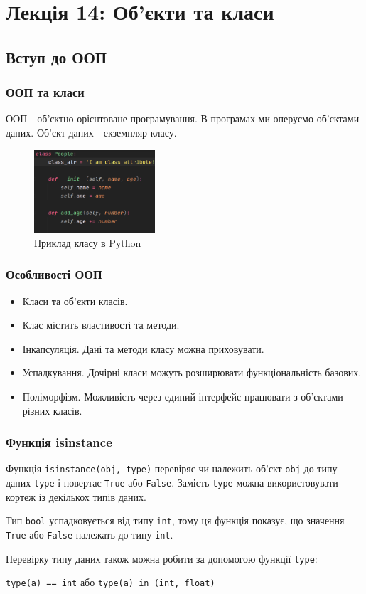 \section*{Лекція 14: Об’єкти та класи}
\subsection{Вступ до ООП} 

\begin{frame}
\frametitle{ООП та класи}
ООП - об'єктно орієнтоване програмування. В програмах ми оперуємо об'єктами даних. Об'єкт даних - екземпляр класу.

\begin{figure}
  \begin{center}
    \includegraphics[width=0.4\textwidth,height=0.4\textheight]{pictures/class.png}
  \caption{Приклад класу в Python}
\label{function}
  \end{center}
\end{figure}

\end{frame}

\begin{frame}
\frametitle{Особливості ООП}
\begin{itemize}
  \item Класи та об'єкти класів.
  \item Клас містить властивості та методи.
  \item Інкапсуляція. Дані та методи класу можна приховувати.
  \item Успадкування. Дочірні класи можуть розширювати функціональність базових.
  \item Поліморфізм. Можливість через единий інтерфейс працювати з об'єктами різних класів.
\end{itemize}

\end{frame}

\begin{frame}
\frametitle{Функція isinstance}

Функція \texttt{isinstance(obj, type)} перевіряє чи належить об'єкт \texttt{obj} до типу даних \texttt{type} і повертає \texttt{True} або \texttt{False}. Замість \texttt{type} можна використовувати кортеж із декількох типів даних.

Тип \texttt{bool} успадковується від типу \texttt{int}, тому ця функція показує, що значення \texttt{True} або \texttt{False} належать до типу \texttt{int}.

Перевірку типу даних також можна робити за допомогою функції \texttt{type}:

\texttt{type(a) == int} або \texttt{type(a) in (int, float)}  

\end{frame}

